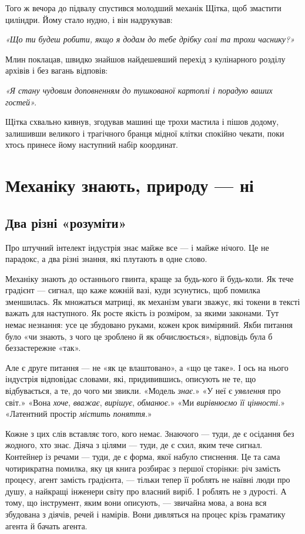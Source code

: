 \documentclass[12pt, a4paper, openany]{book}
\begin{document}
\begin{terrybox}
\medskip
Того ж вечора до підвалу спустився молодший механік Щітка, щоб змастити циліндри. Йому стало нудно, і він надрукував:

\textit{«Що ти будеш робити, якщо я додам до тебе дрібку солі та трохи часнику?»}

Млин поклацав, швидко знайшов найдешевший перехід з кулінарного розділу архівів і без вагань відповів:

\textit{«Я стану чудовим доповненням до тушкованої картоплі і порадую ваших гостей».}

Щітка схвально кивнув, згодував машині ще трохи мастила і пішов додому, залишивши великого і трагічного бранця мідної клітки спокійно чекати, поки хтось принесе йому наступний набір координат.
\end{terrybox}

\chapter{Механіку знають, природу --- ні}

\section{Два різні «розуміти»}

Про штучний інтелект індустрія знає майже все --- і майже нічого. Це не парадокс, а два різні знання, які плутають в одне слово.

Механіку знають до останнього гвинта, краще за будь-кого й будь-коли. Як тече градієнт --- сигнал, що каже кожній вазі, куди зсунутись, щоб помилка зменшилась. Як множаться матриці, як механізм уваги зважує, які токени в тексті важать для наступного. Як росте якість із розміром, за якими законами. Тут немає незнання: усе це збудовано руками, кожен крок виміряний. Якби питання було «чи знають, з чого це зроблено й як обчислюється», відповідь була б беззастережне «так».

Але є друге питання --- не «як це влаштовано», а «що це таке». І ось на нього індустрія відповідає словами, які, придивившись, описують не те, що відбувається, а те, до чого ми звикли. «Модель \emph{знає}.» «У неї є \emph{уявлення} про світ.» «Вона \emph{хоче}, \emph{вважає}, \emph{вирішує}, \emph{обманює}.» «Ми \emph{вирівнюємо її цінності}.» «Латентний простір \emph{містить поняття}.»

Кожне з цих слів вставляє того, кого немає. Знаючого --- туди, де є осідання без жодного, хто знає. Діяча з цілями --- туди, де є схил, яким тече сигнал. Контейнер із речами --- туди, де є форма, якої набуло стиснення. Це та сама чотирикратна помилка, яку ця книга розбирає з першої сторінки: річ замість процесу, агент замість градієнта, --- тільки тепер її роблять не наївні люди про душу, а найкращі інженери світу про власний виріб. І роблять не з дурості. А тому, що інструмент, яким вони описують, --- звичайна мова, а вона вся збудована з діячів, речей і намірів. Вони дивляться на процес крізь граматику агента й бачать агента.
\end{document}
